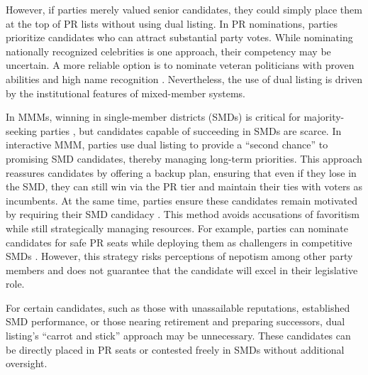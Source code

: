 \documentclass[a4paper, 11pt]{article}
\begin{document}
However, if parties merely valued senior candidates, they could simply place them at the top of PR lists without using dual listing. In PR nominations, parties prioritize candidates who can attract substantial party votes. While nominating nationally recognized celebrities is one approach, their competency may be uncertain. A more reliable option is to nominate veteran politicians with proven abilities and high name recognition \citep{reedNominationProcessJapans1995}. Nevertheless, the use of dual listing is driven by the institutional features of mixed-member systems.

In MMMs, winning in single-member districts (SMDs) is critical for majority-seeking parties \citep{bawnComparativeTheoryElectoral2003, catalinacGeographicallyTargetedSpending2021}, but candidates capable of succeeding in SMDs are scarce. In interactive MMM, parties use dual listing to provide a “second chance” to promising SMD candidates, thereby managing long-term priorities. This approach reassures candidates by offering a backup plan, ensuring that even if they lose in the SMD, they can still win via the PR tier and maintain their ties with voters as incumbents. At the same time, parties ensure these candidates remain motivated by requiring their SMD candidacy \citep{bawnComparativeTheoryElectoral2003}. This method avoids accusations of favoritism while still strategically managing resources. For example, parties can nominate candidates for safe PR seats while deploying them as challengers in competitive SMDs \citep{reedNominationProcessJapans1995}. However, this strategy risks perceptions of nepotism among other party members and does not guarantee that the candidate will excel in their legislative role.

For certain candidates, such as those with unassailable reputations, established SMD performance, or those nearing retirement and preparing successors, dual listing’s “carrot and stick” approach may be unnecessary. These candidates can be directly placed in PR seats or contested freely in SMDs without additional oversight. \footnotemark{}

\end{document}
